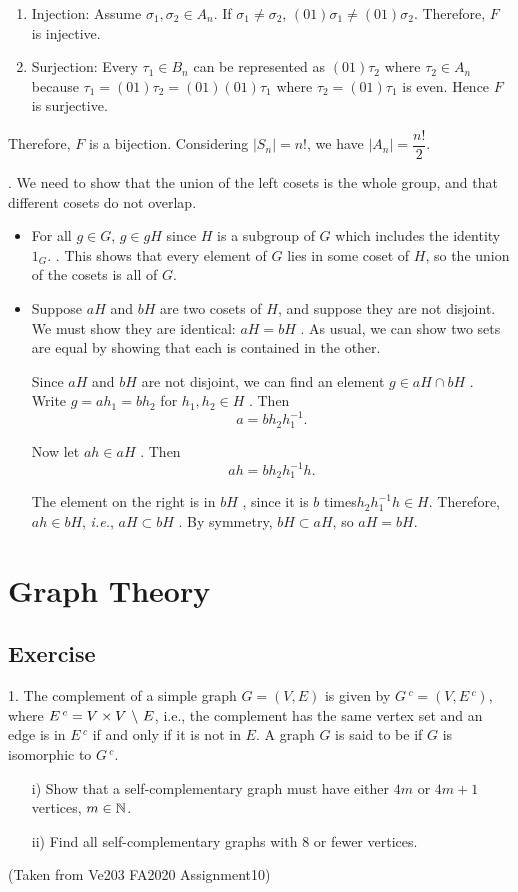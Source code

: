 \documentclass[12pt]{article}
\begin{document}
\begin{enumerate}
			\begin{enumerate}
				\item Injection: Assume $\sigma_1, \sigma_2 \in A_n$. If $\sigma_1 \neq \sigma_2$,  $(01)\sigma_1 \neq (01)\sigma_2$. Therefore, $F$ is injective.
				\item Surjection: Every $\tau_1 \in B_n$ can be represented as $(01)\tau_2$ where $\tau_2 \in A_n$ because $\tau_1 = (01)\tau_2 = (01)(01)\tau_1$ where $\tau_2 = (01)\tau_1$ is even. Hence $F$ is surjective.
			\end{enumerate}
			\par Therefore, $F$ is a bijection. Considering $|S_n| = n!$, we have $|A_n| = \dfrac{n!}{2}$.
			\end{enumerate}
		\par {}. We need to show that the union of the left cosets is the whole group, and that different cosets do not overlap. 
		\begin{itemize}
			\item For all $g \in G$, $g \in gH$ since $H$ is a subgroup of $G$ which includes the identity $1_G$. . This shows that every element of $G$ lies in some coset of $H$, so the union of the cosets is all of $G$.
			\item Suppose $a H$ and $b H$ are two cosets of $H$, and suppose they are not disjoint. We must show they are identical: $a H = b H$ . As usual, we can show two sets are equal by showing that each is contained in the other.
			\par Since $a H$ and $b H$ are not disjoint, we can find an element $g \in a H \cap b H$ . Write $g = a h_1 = b h_2$ for $h_1, h_2 \in H$ . Then $$a = b h_2 h_1^{-1}.$$
			\par Now let $a h \in aH$ . Then	$$a h = b h_2 h_1^{-1} h.$$
			\par The element on the right is in $b H$ , since it is $b$ times$ h_2 h_1^{-1} h \in H$. Therefore, $a h \in b H$, \textit{i.e.}, $a H \subset b H$ . By symmetry, $b H \subset a H$, so $a H = b H$.
		\end{itemize}
	\section{Graph Theory}
		\subsection{Exercise}
		1. The complement of a simple graph $G = (V, E)$ is given by 
		$G\,^c = (V, E\,^c)$, where $E\,^c = V \times V ~\backslash~ E$, i.e., the
    	complement has the same vertex set and an edge is in $E\,^c$
    	if and only if it is not in $E$. A graph $G$ is said to be
    	 if $G$ is isomorphic to $G\,^c$.
    	\begin{itemize}
    	    \item[i)] Show that a self-complementary graph must have either $4m$ or $4m + 1$ vertices, $m\in\mathbb{N}$.
    	    \item[ii)] Find all self-complementary graphs with 8 or fewer vertices.
    	\end{itemize}
    	(Taken from Ve203 FA2020 Assignment10)
\end{document}
